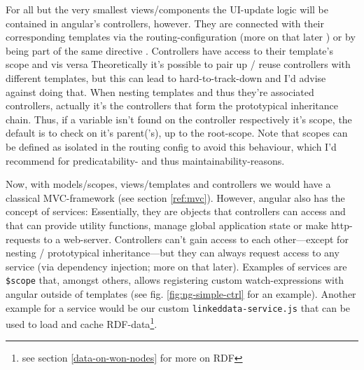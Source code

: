 For all but the very smallest views/components the UI-update logic will be contained in angular's controllers, however. They are connected with their corresponding templates via the routing-configuration (more on that later ) or by being part of the same directive . Controllers have access to their template's scope and vis versa %
Theoretically it's possible to pair up / reuse controllers with different templates, but this can lead to hard-to-track-down and I'd advise against doing that.
When nesting templates and thus they're associated controllers, actually it's the controllers that form the prototypical inheritance chain. Thus, if a variable isn't found on the controller respectively it's scope, the default is to check on it's parent('s), up to the root-scope. Note that scopes can be defined as isolated in the routing config  to avoid this behaviour, which I'd recommend for predicatability- and thus maintainability-reasons.

Now, with models/scopes, views/templates and controllers we would have a classical MVC-framework (see section \ref{ref:mvc}). However, angular also has the concept of services: Essentially, they are objects that controllers can access and that can provide utility functions, manage global application state or make http-requests to a web-server. Controllers can't gain access to each other---except for nesting / prototypical inheritance---but they can always request access to any service (via dependency injection; more on
that later). Examples of services are \texttt{\$scope} that, amongst others, allows registering custom watch-expressions with angular outside of templates (see fig. \ref{fig:ng-simple-ctrl} for an example). Another example for a service would be our custom \texttt{linkeddata-service.js} that can be used to load and cache RDF-data\footnote{see section \ref{data-on-won-nodes} for more on RDF}.


